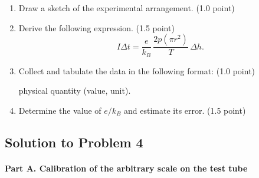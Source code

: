 \begin{enumerate}[label=(\arabic*)]
\item Draw a sketch of the experimental arrangement. (1.0 point)
\item Derive the following expression. (1.5 point)
\begin{equation*}
I\Delta t = \frac{e}{k_B}\,\frac{2p(\pi r^2)}{T}\,\Delta h.
\end{equation*}
\item Collect and tabulate the data in the following format: (1.0 point)

physical quantity (value, unit).

\item Determine the value of $e/k_B$ and estimate its error. (1.5 point)
\end{enumerate}

\subsection*{Solution to Problem 4}

\paragraph{Part A. Calibration of the arbitrary scale on the test tube}

